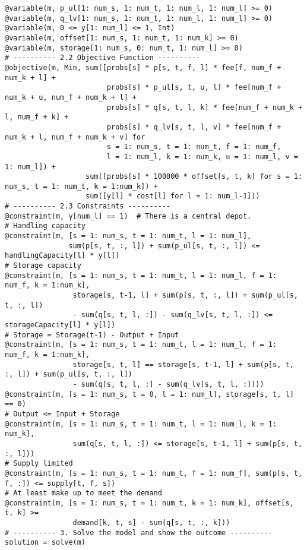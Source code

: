 \documentclass[fleqn,10pt]{wlscirep}
\begin{document}
\begin{lstlisting}
@variable(m, p_ul[1: num_s, 1: num_t, 1: num_l, 1: num_l] >= 0)
@variable(m, q_lv[1: num_s, 1: num_t, 1: num_l, 1: num_l] >= 0)
@variable(m, 0 <= y[1: num_l] <= 1, Int)
@variable(m, offset[1: num_s, 1: num_t, 1: num_k] >= 0)
@variable(m, storage[1: num_s, 0: num_t, 1: num_l] >= 0)
# ---------- 2.2 Objective Function ----------
@objective(m, Min, sum([probs[s] * p[s, t, f, l] * fee[f, num_f + num_k + l] +
                        probs[s] * p_ul[s, t, u, l] * fee[num_f + num_k + u, num_f + num_k + l] +
                        probs[s] * q[s, t, l, k] * fee[num_f + num_k + l, num_f + k] +
                        probs[s] * q_lv[s, t, l, v] * fee[num_f + num_k + l, num_f + num_k + v] for
                        s = 1: num_s, t = 1: num_t, f = 1: num_f,
                        l = 1: num_l, k = 1: num_k, u = 1: num_l, v = 1: num_l]) +
                   sum([probs[s] * 100000 * offset[s, t, k] for s = 1: num_s, t = 1: num_t, k = 1:num_k]) +
                   sum([y[l] * cost[l] for l = 1: num_l-1]))
# ---------- 2.3 Constraints ----------
@constraint(m, y[num_l] == 1)  # There is a central depot.
# Handling capacity
@constraint(m, [s = 1: num_s, t = 1: num_t, l = 1: num_l],
               sum(p[s, t, :, l]) + sum(p_ul[s, t, :, l]) <= handlingCapacity[l] * y[l])
# Storage capacity
@constraint(m, [s = 1: num_s, t = 1: num_t, l = 1: num_l, f = 1: num_f, k = 1:num_k],
                storage[s, t-1, l] + sum(p[s, t, :, l]) + sum(p_ul[s, t, :, l])
                - sum(q[s, t, l, :]) - sum(q_lv[s, t, l, :]) <= storageCapacity[l] * y[l])
# Storage = Storage(t-1) - Output + Input
@constraint(m, [s = 1: num_s, t = 1: num_t, l = 1: num_l, f = 1: num_f, k = 1:num_k],
                storage[s, t, l] == storage[s, t-1, l] + sum(p[s, t, :, l]) + sum(p_ul[s, t, :, l])
                - sum(q[s, t, l, :] - sum(q_lv[s, t, l, :])))
@constraint(m, [s = 1: num_s, t = 0, l = 1: num_l], storage[s, t, l] == 0)
# Output <= Input + Storage
@constraint(m, [s = 1: num_s, t = 1: num_t, l = 1: num_l, k = 1: num_k],
                sum(q[s, t, l, :]) <= storage[s, t-1, l] + sum(p[s, t, :, l]))
# Supply limited
@constraint(m, [s = 1: num_s, t = 1: num_t, f = 1: num_f], sum(p[s, t, f, :]) <= supply[t, f, s])
# At least make up to meet the demand
@constraint(m, [s = 1: num_s, t = 1: num_t, k = 1: num_k], offset[s, t, k] >= 
                demand[k, t, s] - sum(q[s, t, :, k]))
# ---------- 3. Solve the model and show the outcome ----------
solution = solve(m)
\end{lstlisting}
\end{document}
